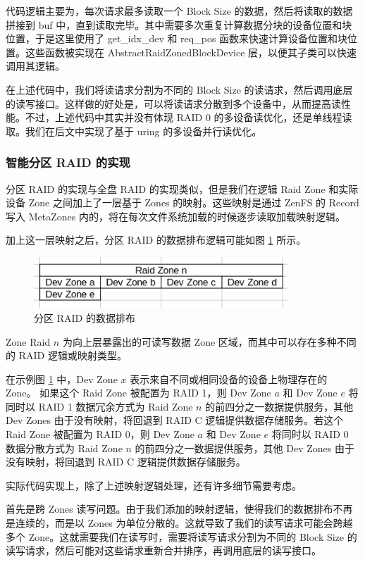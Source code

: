 代码逻辑主要为，每次请求最多读取一个 Block Size 的数据，然后将读取的数据拼接到 buf 中，直到读取完毕。其中需要多次重复计算数据分块的设备位置和块位置，于是这里使用了 get\_idx\_dev 和 req\_pos 函数来快速计算设备位置和块位置。这些函数被实现在 AbstractRaidZonedBlockDevice 层，以便其子类可以快速调用其逻辑。

在上述代码中，我们将读请求分割为不同的 Block Size 的读请求，然后调用底层的读写接口。这样做的好处是，可以将读请求分散到多个设备中，从而提高读性能。不过，上述代码中其实并没有体现 RAID 0 的多设备读优化，还是单线程读取。我们在后文中实现了基于 uring 的多设备并行读优化。

\subsubsection{智能分区 RAID 的实现}

分区 RAID 的实现与全盘 RAID 的实现类似，但是我们在逻辑 Raid Zone 和实际设备 Zone 之间加上了一层基于 Zones 的映射。这些映射是通过 ZenFS 的 Record 写入 MetaZones 内的，将在每次文件系统加载的时候逐步读取加载映射逻辑。

加上这一层映射之后，分区 RAID 的数据排布逻辑可能如图 \ref{raid-a} 所示。

\begin{figure}[htbp]
  \centering
  \includegraphics[width=0.85\textwidth]{fig/raid-a.png}
  \caption{ 分区 RAID 的数据排布 }
  \label{raid-a}
\end{figure}

Zone Raid $n$ 为向上层暴露出的可读写数据 Zone 区域，而其中可以存在多种不同的 RAID 逻辑或映射类型。

在示例图 \ref{raid-a} 中，Dev Zone $x$ 表示来自不同或相同设备的设备上物理存在的 Zone。
如果这个 Raid Zone 被配置为 RAID 1，则 Dev Zone $a$ 和 Dev Zone $e$ 将同时以 RAID 1 数据冗余方式为 Raid Zone $n$ 的前四分之一数据提供服务，其他 Dev Zones 由于没有映射，将回退到 RAID C 逻辑提供数据存储服务。若这个 Raid Zone 被配置为 RAID 0，则 Dev Zone $a$ 和 Dev Zone $e$ 将同时以 RAID 0 数据分散方式为 Raid Zone $n$ 的前四分之一数据提供服务，其他 Dev Zones 由于没有映射，将回退到 RAID C 逻辑提供数据存储服务。

实际代码实现上，除了上述映射逻辑处理，还有许多细节需要考虑。

首先是跨 Zones 读写问题。由于我们添加的映射逻辑，使得我们的数据排布不再是连续的，而是以 Zones 为单位分散的。这就导致了我们的读写请求可能会跨越多个 Zone。这就需要我们在读写时，需要将读写请求分割为不同的 Block Size 的读写请求，然后可能对这些请求重新合并排序，再调用底层的读写接口。

